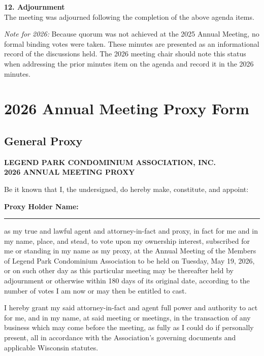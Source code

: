 \documentclass[11pt]{article}
\newcommand{\strong}[1]{\textbf{#1}}
\begin{document}
\noindent
\strong{12. Adjournment}\\[0.5em]
The meeting was adjourned following the completion of the above agenda items.

\vspace{1.5em}

\noindent
\textit{Note for 2026:} Because quorum was not achieved at the 2025 Annual Meeting, no
formal binding votes were taken. These minutes are presented as an informational record of
the discussions held. The 2026 meeting chair should note this status when addressing the
prior minutes item on the agenda and record it in the 2026 minutes.

\newpage

\section{2026 Annual Meeting Proxy Form}

\subsection*{General Proxy}
\vspace{-0.6em}

\noindent
\textbf{LEGEND PARK CONDOMINIUM ASSOCIATION, INC.}\\[0.25em]
\textbf{2026 ANNUAL MEETING PROXY}

\vspace{1em}

\noindent
Be it known that I, the undersigned, do hereby make, constitute, and appoint:

\vspace{1em}
\noindent
\strong{Proxy Holder Name:} \rule{3.5in}{0.4pt}

\vspace{1em}

\noindent
as my true and lawful agent and attorney-in-fact and proxy, in fact for me and in my name,
place, and stead, to vote upon my ownership interest, subscribed for me or standing in my
name as my proxy, at the Annual Meeting of the Members of Legend Park Condominium Association
to be held on Tuesday, May 19, 2026, or on such other day as this particular meeting may be
thereafter held by adjournment or otherwise within 180 days of its original date, according
to the number of votes I am now or may then be entitled to cast.

\medskip

\noindent
I hereby grant my said attorney-in-fact and agent full power and authority to act for me,
and in my name, at said meeting or meetings, in the transaction of any business which may
come before the meeting, as fully as I could do if personally present, all in accordance
with the Association's governing documents and applicable Wisconsin statutes.
\end{document}
